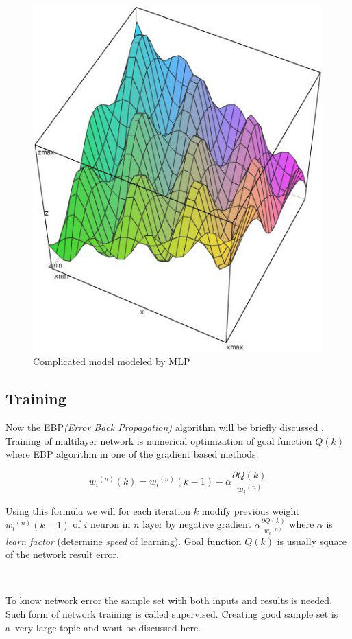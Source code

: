 \begin{figure}[!h]
    \centering
    \includegraphics[scale=0.8]{Media/SolutionGraph.png}
    \caption{Complicated model modeled by MLP}
    \label{fig:SolutionGraph}
\end{figure}

\newpage
\subsection{Training}
\label{sec:Training}

Now the EBP\textit{(Error Back Propagation)} algorithm will be briefly discussed \cite{sRpNAI369,mlpFSaC,fsmlpDwrSkrMk,mlpPawelRosczak}.
Training of multilayer network is numerical optimization of goal function $Q(k)$ where EBP algorithm in one of the gradient based methods.

\begin{mycapequ}[!ht]
    $$ {w_i}^{(n)}(k) = {w_i}^{(n)}(k-1)-\alpha\frac{\partial Q(k)}{{w_i}^{(n)}} $$
    \caption{Error Back Propagation \cite{mlpPawelRosczak}}
    \label{formula:EBP}
\end{mycapequ}

Using this formula we will for each iteration $k$ modify previous weight ${w_i}^{(n)}(k-1)$ of $i$ neuron in $n$ layer by negative gradient $\displaystyle{\alpha\frac{\partial Q(k)}{{w_i}^{(n)}}}$ where $\alpha$ is \textit{learn factor} (determine \textit{speed} of learning).
Goal function $Q(k)$ is usually square of the network result error.

\ 


To know network error the sample set with both inputs and results is needed. Such form of network training is called supervised. Creating good sample set is a~very large topic and wont be discussed here.

